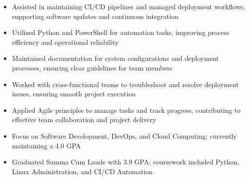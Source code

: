 \par\smallskip
\noindent
\begin{minipage}{20cm}
  \begin{minipage}{9.75cm}
    \begin{itemize}
      \item Assisted in maintaining CI/CD pipelines and managed deployment workflows, supporting software updates and continuous integration
      \item Utilized Python and PowerShell for automation tasks, improving process efficiency and operational reliability
      \item Maintained documentation for system configurations and deployment processes, ensuring clear guidelines for team members
    \end{itemize}
  \end{minipage}
  \hfill
  \begin{minipage}{9.75cm}
    \begin{itemize}
      \item Worked with cross-functional teams to troubleshoot and resolve deployment issues, ensuring smooth project execution
      \item Applied Agile principles to manage tasks and track progress, contributing to effective team collaboration and project delivery
    \end{itemize}
  \end{minipage}
\end{minipage}

\begin{itemize}
  \item Focus on Software Development, DevOps, and Cloud Computing; currently maintaining a 4.0 GPA
\end{itemize}
\divider

\begin{itemize}
  \item Graduated Summa Cum Laude with 3.9 GPA; coursework included Python, Linux Administration, and CI/CD Automation
\end{itemize}

\noindent
\begin{minipage}{20cm}
     
     
     
\end{minipage}



